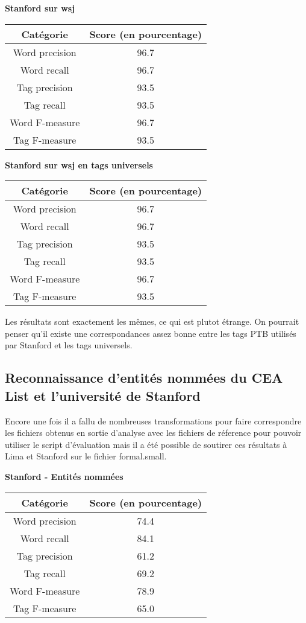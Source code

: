 \documentclass[12pt]{report}
\begin{document}
\textbf{Stanford sur wsj}

\begin{tabular}{c c}
\hline
  Catégorie & Score (en pourcentage) \\
\hline
    Word precision & 96.7 \\
    Word recall & 96.7 \\
    Tag precision & 93.5 \\
    Tag recall & 93.5 \\
    Word F-measure & 96.7 \\
    Tag F-measure & 93.5 \\
    
\end{tabular}

\vspace{15mm}
\newpage

\textbf{Stanford sur wsj en tags universels}

\begin{tabular}{c c}
\hline
  Catégorie & Score (en pourcentage) \\
\hline
    Word precision & 96.7 \\
    Word recall & 96.7 \\
    Tag precision & 93.5 \\
    Tag recall & 93.5 \\
    Word F-measure & 96.7 \\
    Tag F-measure & 93.5 \\
    
\end{tabular}

Les résultats sont exactement les mêmes, ce qui est plutot étrange. On pourrait penser qu'il existe une correspondances assez bonne entre les tags PTB utilisés par Stanford et les tags universels.

\subsection{Reconnaissance d’entités nommées du CEA List et l’université de Stanford}

Encore une fois il a fallu de nombreuses transformations pour faire correspondre les fichiers obtenus en sortie d'analyse avec les fichiers de réference pour pouvoir utiliser le script d'évaluation mais il a été possible de soutirer ces résultats à Lima et Stanford sur le fichier formal.small.

\textbf{Stanford - Entités nommées}

\begin{tabular}{c c}
\hline
  Catégorie & Score (en pourcentage) \\
\hline
    Word precision & 74.4 \\
    Word recall & 84.1 \\
    Tag precision & 61.2 \\
    Tag recall & 69.2 \\
    Word F-measure & 78.9 \\
    Tag F-measure & 65.0 \\
    
\end{tabular}
\end{document}
